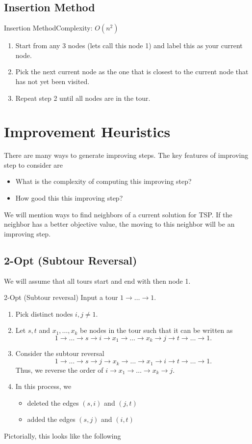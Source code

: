 \subsection{Insertion Method }
\begin{general}{Insertion Method}{Complexity: $O(n^2)$}
\label{heuristic:insertion}
\begin{enumerate}
\item Start from any 3 nodes (lets call this node 1) and label this as your current node.
\item Pick the next current node as the one that is closest to the current node that has not yet been visited.
\item Repeat step 2 until all nodes are in the tour.
\end{enumerate}
\end{general}


\section{Improvement Heuristics}
There are many ways to generate improving steps.  The key features of improving step to consider are
\begin{itemize}
\item What is the complexity of  computing this improving step?
\item How good this this improving step?
\end{itemize}

We will mention ways to find neighbors of a current solution for TSP.  If the neighbor has a better objective value, the moving to this neighbor will be an improving step. 


\subsection{2-Opt (Subtour Reversal)}
We will assume that all tours start and end with then node 1.  

\begin{general}{2-Opt (Subtour reversal)}{}
Input a tour $1 \to \dots \to 1$. 
\begin{enumerate}
\item Pick distinct nodes $i,j \neq 1$.
\item Let $s,t$ and $x_1, \dots, x_k$ be nodes in the tour such that it can be written as 
$$
1 \to \dots \to s \to i \to x_1 \to \dots \to x_k  \to j \to t \to \dots \to 1.
$$
\item Consider the subtour reversal
$$
1 \to \dots \to s \to j \to x_k \to \dots \to x_1  \to i \to t \to \dots \to 1.
$$
Thus, we reverse the order of $ i \to x_1 \to \dots \to x_k \to j$.  
\item In this process, we 
\begin{itemize}
\item deleted the edges $(s,i)$ and $(j,t)$
\item added the edges $(s,j)$ and $(i,t)$
\end{itemize}
\end{enumerate}
\end{general}
Pictorially, this looks like the following 

